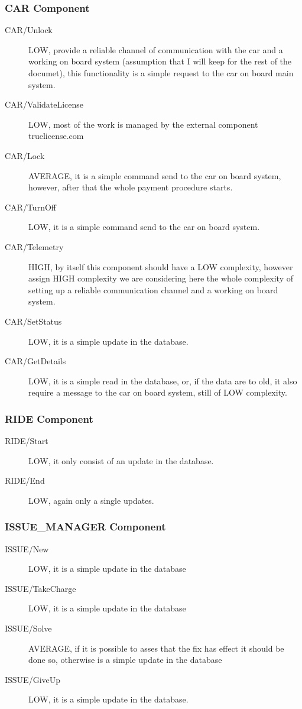 \documentclass[11pt]{article} %
\begin{document}
\subsubsection{CAR Component}

\begin{description}
	\item[CAR/Unlock] LOW, provide a reliable channel of communication with the car and a working on board system (assumption that I will keep for the rest of the documet), this functionality is a simple request to the car on board main system.
	\item[CAR/ValidateLicense] LOW, most of the work is managed by the external component truelicense.com
	\item[CAR/Lock] AVERAGE, it is a simple command send to the car on board system, however, after that the whole payment procedure starts.
	\item[CAR/TurnOff] LOW, it is a simple command send to the car on board system.
	\item[CAR/Telemetry] HIGH, by itself this component should have a LOW complexity, however assign HIGH complexity we are considering here the whole complexity of setting up a reliable communication channel and a working on board system.
	\item[CAR/SetStatus] LOW, it is a simple update in the database.
	\item[CAR/GetDetails] LOW, it is a simple read in the database, or, if the data are to old, it also require a message to the car on board system, still of LOW complexity.
\end{description}

\subsubsection{RIDE Component}

\begin{description}
	\item [RIDE/Start] LOW, it only consist of an update in the database.
	\item [RIDE/End] LOW, again only a single updates.
\end{description}

\subsubsection{ISSUE\_MANAGER Component}

\begin{description}
	\item[ISSUE/New] LOW, it is a simple update in the database
	\item[ISSUE/TakeCharge] LOW, it is a simple update in the database
	\item[ISSUE/Solve] AVERAGE, if it is possible to asses that the fix has effect it should be done so, otherwise is a simple update in the database
	\item[ISSUE/GiveUp] LOW, it is a simple update in the database.
\end{description}
\end{document}
